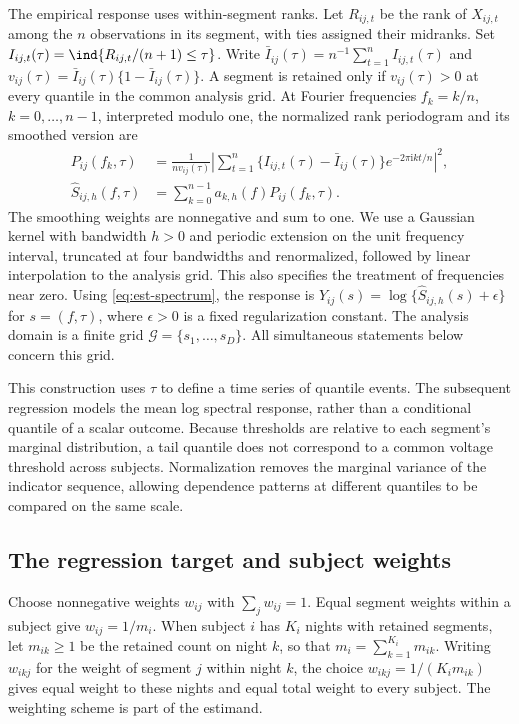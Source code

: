 The empirical response uses within-segment ranks. Let $R_{ij,t}$ be the rank of $X_{ij,t}$ among the $n$ observations in its segment, with ties assigned their midranks. Set $I_{ij,t}(\tau)=\ind\{R_{ij,t}/(n+1)\leq\tau\}$. Write $\bar I_{ij}(\tau)=n^{-1}\sum_{t=1}^n I_{ij,t}(\tau)$ and $v_{ij}(\tau)=\bar I_{ij}(\tau)\{1-\bar I_{ij}(\tau)\}$. A segment is retained only if $v_{ij}(\tau)>0$ at every quantile in the common analysis grid. At Fourier frequencies $f_k=k/n$, $k=0,\ldots,n-1$, interpreted modulo one, the normalized rank periodogram and its smoothed version are
\begin{equation}\label{eq:est-spectrum}
 \begin{split}
 P_{ij}(f_k,\tau)
 &=\frac{1}{n v_{ij}(\tau)}
 \left|\sum_{t=1}^n\{I_{ij,t}(\tau)-\bar I_{ij}(\tau)\}
 e^{-2\pi\mathrm{i}kt/n}\right|^2,\\
 \widehat S_{ij,h}(f,\tau)
 &=\sum_{k=0}^{n-1}a_{k,h}(f)P_{ij}(f_k,\tau).
 \end{split}
\end{equation}
The smoothing weights are nonnegative and sum to one. We use a Gaussian kernel with bandwidth $h>0$ and periodic extension on the unit frequency interval, truncated at four bandwidths and renormalized, followed by linear interpolation to the analysis grid. This also specifies the treatment of frequencies near zero. Using \eqref{eq:est-spectrum}, the response is $Y_{ij}(s)=\log\{\widehat S_{ij,h}(s)+\epsilon\}$ for $s=(f,\tau)$, where $\epsilon>0$ is a fixed regularization constant. The analysis domain is a finite grid $\mathcal G=\{s_1,\ldots,s_D\}$. All simultaneous statements below concern this grid.

This construction uses $\tau$ to define a time series of quantile events. The subsequent regression models the mean log spectral response, rather than a conditional quantile of a scalar outcome. Because thresholds are relative to each segment's marginal distribution, a tail quantile does not correspond to a common voltage threshold across subjects. Normalization removes the marginal variance of the indicator sequence, allowing dependence patterns at different quantiles to be compared on the same scale.

\subsection{The regression target and subject weights}
Choose nonnegative weights $w_{ij}$ with $\sum_j w_{ij}=1$. Equal segment weights within a subject give $w_{ij}=1/m_i$. When subject $i$ has $K_i$ nights with retained segments, let $m_{ik}\geq1$ be the retained count on night $k$, so that $m_i=\sum_{k=1}^{K_i}m_{ik}$. Writing $w_{ikj}$ for the weight of segment $j$ within night $k$, the choice $w_{ikj}=1/(K_i m_{ik})$ gives equal weight to these nights and equal total weight to every subject. The weighting scheme is part of the estimand.

